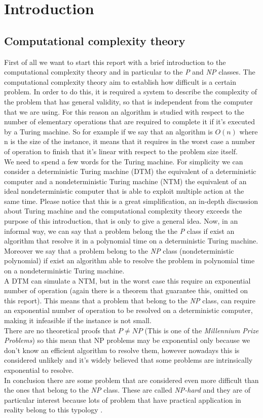 \chapter{Introduction}

\section{Computational complexity theory}
First of all we want to start this report with a brief introduction to the computational complexity theory and in particular to the \textit{P} and \textit{NP}
classes. 
The computational complexity theory aim to establish how difficult is a certain problem. In order to do this, it is required a system to describe the complexity of the problem that has general validity, so that is independent from the computer that we are using. For this reason an algorithm is studied with respect to the number of elementary operations that are required to complete it if it's executed by a Turing machine. So for example if we say that an algorithm is $O(n)$ where n is the size of the instance, it means that it requires in the worst case a number of operation to finish that it's linear with respect to the problem size itself. \\
We need to spend a few words for the Turing machine. For simplicity we can consider a deterministic Turing machine (DTM) the equivalent of a deterministic computer and a nondeterministic Turing machine (NTM) the equivalent of an ideal nondeterministic computer that is able to exploit multiple action at the same time. Please notice that this is a great simplification, an in-depth discussion about Turing machine and the computational complexity theory exceeds the purpose of this introduction, that is only to give a general idea. 
Now, in an informal way, we can say that a problem belong the the \textit{P} class if exist an algorithm that resolve it in a polynomial time on a deterministic Turing machine. Moreover we say that a problem belong to the \textit{NP} class (nondeterministic polynomial) if exist an algorithm able to resolve the problem in polynomial time on a nondeterministic Turing machine. \\
A DTM can simulate a NTM, but in the worst case this require an exponential number of operation (again there is a theorem that guarantee this, omitted on this report). This means that a problem that belong to the \textit{NP} class, can require an exponential number of operation to be resolved on a deterministic computer, making it infeasible if the instance is not small. \\
There are no theoretical proofs that $P \neq NP$ (This is one of the \textit{Millennium Prize Problems}) so this mean that NP problems may be exponential only because we don't know an efficient algorithm to resolve them, however nowadays this is considered unlikely and it's widely believed that some problems are intrinsically exponential to resolve.\\
In conclusion there are some problem that are considered even more difficult than the ones that belong to the \textit{NP} class. These are called \textit{NP-hard} and they are of particular interest because lots of problem that have practical application in reality belong to this typology \cite{automi}. 

